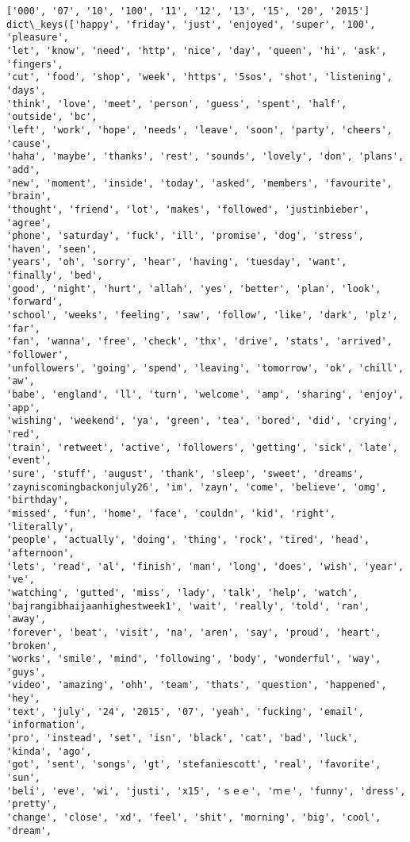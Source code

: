 \documentclass[11pt]{article}
\begin{document}
    \begin{Verbatim}[commandchars=\\\{\}]
['000', '07', '10', '100', '11', '12', '13', '15', '20', '2015']
dict\_keys(['happy', 'friday', 'just', 'enjoyed', 'super', '100', 'pleasure',
'let', 'know', 'need', 'http', 'nice', 'day', 'queen', 'hi', 'ask', 'fingers',
'cut', 'food', 'shop', 'week', 'https', '5sos', 'shot', 'listening', 'days',
'think', 'love', 'meet', 'person', 'guess', 'spent', 'half', 'outside', 'bc',
'left', 'work', 'hope', 'needs', 'leave', 'soon', 'party', 'cheers', 'cause',
'haha', 'maybe', 'thanks', 'rest', 'sounds', 'lovely', 'don', 'plans', 'add',
'new', 'moment', 'inside', 'today', 'asked', 'members', 'favourite', 'brain',
'thought', 'friend', 'lot', 'makes', 'followed', 'justinbieber', 'agree',
'phone', 'saturday', 'fuck', 'ill', 'promise', 'dog', 'stress', 'haven', 'seen',
'years', 'oh', 'sorry', 'hear', 'having', 'tuesday', 'want', 'finally', 'bed',
'good', 'night', 'hurt', 'allah', 'yes', 'better', 'plan', 'look', 'forward',
'school', 'weeks', 'feeling', 'saw', 'follow', 'like', 'dark', 'plz', 'far',
'fan', 'wanna', 'free', 'check', 'thx', 'drive', 'stats', 'arrived', 'follower',
'unfollowers', 'going', 'spend', 'leaving', 'tomorrow', 'ok', 'chill', 'aw',
'babe', 'england', 'll', 'turn', 'welcome', 'amp', 'sharing', 'enjoy', 'app',
'wishing', 'weekend', 'ya', 'green', 'tea', 'bored', 'did', 'crying', 'red',
'train', 'retweet', 'active', 'followers', 'getting', 'sick', 'late', 'event',
'sure', 'stuff', 'august', 'thank', 'sleep', 'sweet', 'dreams',
'zayniscomingbackonjuly26', 'im', 'zayn', 'come', 'believe', 'omg', 'birthday',
'missed', 'fun', 'home', 'face', 'couldn', 'kid', 'right', 'literally',
'people', 'actually', 'doing', 'thing', 'rock', 'tired', 'head', 'afternoon',
'lets', 'read', 'al', 'finish', 'man', 'long', 'does', 'wish', 'year', 've',
'watching', 'gutted', 'miss', 'lady', 'talk', 'help', 'watch',
'bajrangibhaijaanhighestweek1', 'wait', 'really', 'told', 'ran', 'away',
'forever', 'beat', 'visit', 'na', 'aren', 'say', 'proud', 'heart', 'broken',
'works', 'smile', 'mind', 'following', 'body', 'wonderful', 'way', 'guys',
'video', 'amazing', 'ohh', 'team', 'thats', 'question', 'happened', 'hey',
'text', 'july', '24', '2015', '07', 'yeah', 'fucking', 'email', 'information',
'pro', 'instead', 'set', 'isn', 'black', 'cat', 'bad', 'luck', 'kinda', 'ago',
'got', 'sent', 'songs', 'gt', 'stefaniescott', 'real', 'favorite', 'sun',
'beli', 'eve', 'wi', 'justi', 'x15', 'ｓｅｅ', 'ｍｅ', 'funny', 'dress', 'pretty',
'change', 'close', 'xd', 'feel', 'shit', 'morning', 'big', 'cool', 'dream',

\end{Verbatim}
\end{document}
